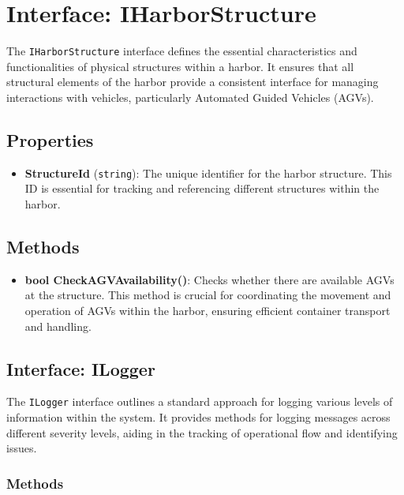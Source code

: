 \documentclass[12pt]{article}
\begin{document}
\newpage
\section*{Interface: IHarborStructure}

The \texttt{IHarborStructure} interface defines the essential characteristics and functionalities of physical structures within a harbor. It ensures that all structural elements of the harbor provide a consistent interface for managing interactions with vehicles, particularly Automated Guided Vehicles (AGVs).

\subsection*{Properties}

\begin{itemize}
    \item \textbf{StructureId} (\texttt{string}): The unique identifier for the harbor structure. This ID is essential for tracking and referencing different structures within the harbor.
\end{itemize}

\subsection*{Methods}

\begin{itemize}
    \item \textbf{bool CheckAGVAvailability()}: Checks whether there are available AGVs at the structure. This method is crucial for coordinating the movement and operation of AGVs within the harbor, ensuring efficient container transport and handling.
\end{itemize}

\newpage
\subsection*{Interface: ILogger}

The \texttt{ILogger} interface outlines a standard approach for logging various levels of information within the system. It provides methods for logging messages across different severity levels, aiding in the tracking of operational flow and identifying issues.

\subsubsection*{Methods}
\end{document}
